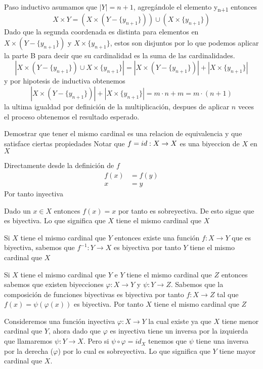 \documentclass{homework}
\begin{document}
Paso inductivo asumamos que \(|Y| = n + 1\), agregándole el elemento y\textsubscript{n+1} entonces
\begin{equation*}
    X \times Y = (X \times (Y - \{y_{n+1}\})) \cup (X \times \{y_{n+1}\})
\end{equation*}
Dado que la segunda coordenada es distinta para elementos en \(X \times (Y - \{y_{n+1}\})\) y \(X \times \{y_{n+1}\}\), estos son disjuntos
por lo que podemos aplicar la parte B para decir que su cardinalidad es la suma de las cardinalidades.
\begin{equation*}
    |X \times (Y - \{y_{n+1}\}) \cup X \times \{y_{n+1}\}| = |X \times (Y - \{y_{n+1}\})| + |X \times \{y_{n+1}\}|
\end{equation*}
y por hipotesis de inductiva obtenemos
\begin{equation*}
    |X \times (Y - \{y_{n+1}\})| + |X \times \{y_{n+1}\}| = m \cdot n + m = m \cdot (n + 1)
\end{equation*}
la ultima igualdad por definición de la multiplicación, despues de aplicar \(n\) veces el proceso obtenemos el resultado esperado.

\question Demostrar que tener el mismo cardinal es una relacion de equivalencia y que satisface ciertas propiedades
\label{sec:org570dccc}
\parte
Notar que \(f = id: X \to X\) es una biyeccion de \(X\) en \(X\)

Directamente desde la definición de \(f\)
\begin{align*}
    f(x) &= f(y)\\
    x &= y
\end{align*}
Por tanto inyectiva

Dado un \(x \in X\) entonces \(f(x) = x\) por tanto es sobreyectiva. De esto sigue que es
biyectiva. Lo que significa que \(X\) tiene el mismo cardinal que \(X\)

\parte
Si \(X\) tiene el mismo cardinal que \(Y\) entonces existe
una función \(f: X \to Y\) que es biyectiva, sabemos
que \(f^{-1}: Y \to X\) es biyectiva por tanto \(Y\) tiene el mismo cardinal que \(X\)

\parte
Si \(X\) tiene el mismo cardinal que \(Y\) e \(Y\) tiene el mismo cardinal que \(Z\)
entonces sabemos que existen biyecciones \(\varphi : X \to Y\) y \(\psi : Y \to Z\).
Sabemos que la composición de funciones biyectivas es biyectiva por tanto
\(f : X \to Z\) tal que \(f(x) = \psi(\varphi(x))\) es biyectiva. Por tanto
\(X\) tiene el mismo cardinal que \(Z\)

\parte
Consideremos una función inyectiva \(\varphi : X \to Y\) la cual existe ya que \(X\) tiene menor cardinal que
\(Y\), ahora dado que \(\varphi\) es inyectiva tiene un inversa por la izquierda que llamaremos \(\psi : Y \to X\).
Pero si \(\psi \circ \varphi = id_X\) tenemos que \(\psi\) tiene una inversa por la derecha (\(\varphi\)) por lo cual es sobreyectiva.
Lo que significa que \(Y\) tiene mayor cardinal que \(X\).
\end{document}
